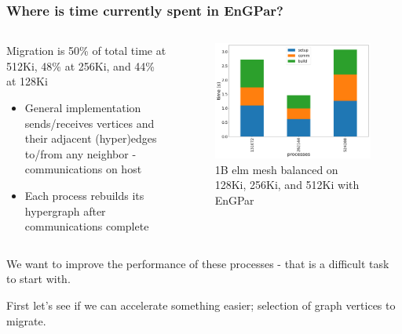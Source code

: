 \documentclass{beamer}
\begin{document}
\begin{frame}
  \frametitle{Where is time currently spent in EnGPar?}
  \begin{columns}
    \begin{column}{0.5\textwidth}
      Migration is 50\% of total time at 512Ki, 48\% at 256Ki, and 44\% at 128Ki
      \begin{itemize}
        \item General implementation sends/receives vertices and their adjacent
          (hyper)edges to/from any neighbor - communications on host
        \item Each process rebuilds its hypergraph after communications complete
      \end{itemize}
    \end{column}

    \begin{column}{0.5\textwidth}
      \begin{figure}
        \centering
        \includegraphics[width=.8\textwidth]{results/aero1Belm/migration.png}\\
        \tiny 1B elm mesh balanced on 128Ki, 256Ki, and 512Ki with EnGPar
      \end{figure}
    \end{column}
  \end{columns}
  \bigskip
  We want to improve the performance of these processes - that is a difficult
  task to start with.
  
  First let's see if we can accelerate something easier; selection of graph
  vertices to migrate.
\end{frame}
\end{document}
